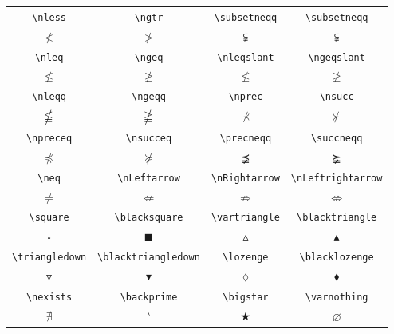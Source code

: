 \documentclass[11pt,a4paper]{article}
\begin{document}
\begin{table}[htp]
\centering
\begin{tabular}{cccc}
	\verb|\nless| & \verb|\ngtr| & \verb|\subsetneqq| & \verb|\subsetneqq|\\	
	$\nless$ & $\ngtr$ & $\subsetneqq$ & $\subsetneqq$\\
	\hline
	\verb|\nleq| & \verb|\ngeq| & \verb|\nleqslant| & \verb|\ngeqslant| \\	
	$\nleq$ & $\ngeq$ & $\nleqslant$ & $\ngeqslant$ \\
	\hline
	\verb|\nleqq| & \verb|\ngeqq| & \verb|\nprec| & \verb|\nsucc| \\	
	$\nleqq$ & $\ngeqq$ & $\nprec$ & $\nsucc$ \\
	\hline
	\verb|\npreceq| & \verb|\nsucceq| & \verb|\precneqq| & \verb|\succneqq| \\	
	$\npreceq$ & $\nsucceq$ & $\precneqq$ & $\succneqq$ \\
	\hline
	\verb|\neq| & \verb|\nLeftarrow| & \verb|\nRightarrow| & \verb|\nLeftrightarrow| \\	
	$\neq$ & $\nLeftarrow$ & $\nRightarrow$ & $\nLeftrightarrow$ \\
	\hline
	\verb|\square| & \verb|\blacksquare| & \verb|\vartriangle| & \verb|\blacktriangle| \\	
	$\square$ & $\blacksquare$ & $\vartriangle$ & $\blacktriangle$ \\
	\hline
	\verb|\triangledown| & \verb|\blacktriangledown| & \verb|\lozenge| & \verb|\blacklozenge| \\	
	$\triangledown$ & $\blacktriangledown$ & $\lozenge$ & $\blacklozenge$ \\
	\hline
	\verb|\nexists| & \verb|\backprime| & \verb|\bigstar| & \verb|\varnothing| \\	
	$\nexists$ & $\backprime$ & $\bigstar$ & $\varnothing$ \\
	\hline
\end{tabular}	
\end{table}
\end{document}

